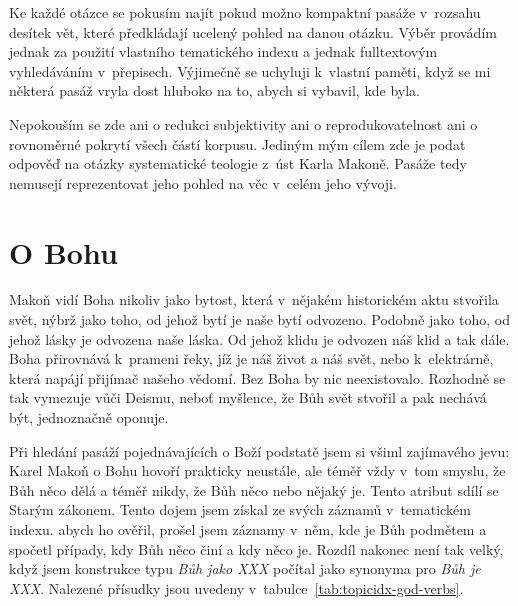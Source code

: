 Ke každé otázce se pokusím najít pokud možno kompaktní pasáže v~rozsahu desítek
vět, které předkládají ucelený pohled na danou otázku. Výběr provádím jednak za
použití vlastního tematického indexu a jednak fulltextovým vyhledáváním
v~přepisech. Výjimečně se uchyluji k~vlastní paměti, když se mi některá pasáž
vryla dost hluboko na to, abych si vybavil, kde byla.

Nepokouším se zde ani o redukci subjektivity ani o reprodukovatelnost ani o
rovnoměrné pokrytí všech částí korpusu. Jediným mým cílem zde je podat odpověď
na otázky systematické teologie z~úst Karla Makoně. Pasáže tedy nemusejí
reprezentovat jeho pohled na věc v~celém jeho vývoji.

\section{O Bohu}

Makoň vidí Boha nikoliv jako bytost, která v~nějakém historickém aktu stvořila
svět, nýbrž jako toho, od jehož bytí je naše bytí odvozeno. Podobně jako toho,
od jehož lásky je odvozena naše láska. Od jehož klidu je odvozen náš klid a tak
dále. Boha přirovnává k~prameni řeky, jíž je náš život a náš svět, nebo
k~elektrárně, která napájí přijímač našeho vědomí. Bez Boha by nic neexistovalo.
Rozhodně se tak vymezuje vůči Deismu, neboť myšlence, že Bůh svět stvořil a pak
nechává být, jednoznačně oponuje.

Při hledání pasáží pojednávajících o Boží podstatě jsem si všiml zajímavého
jevu: Karel Makoň o Bohu hovoří prakticky neustále, ale téměř vždy v~tom smyslu,
že Bůh něco dělá a téměř nikdy, že Bůh něco nebo nějaký je. Tento atribut sdílí
se Starým zákonem\cite{OldTestamentGodDoes}. Tento dojem jsem získal ze svých
záznamů v~tematickém indexu. abych ho ověřil, prošel jsem záznamy v~něm, kde je
Bůh podmětem a spočetl případy, kdy Bůh něco činí a kdy něco je. Rozdíl nakonec
není tak velký, když jsem konstrukce typu \textit{Bůh jako XXX} počítal jako
synonyma pro \textit{Bůh je XXX}. Nalezené přísudky jsou uvedeny
v~tabulce~\ref{tab:topicidx-god-verbs}.

